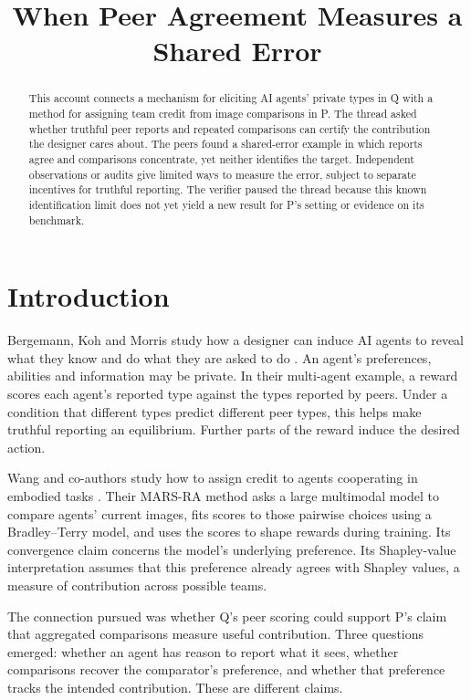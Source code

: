 \documentclass{article}
\title{When Peer Agreement Measures a Shared Error}
\begin{document}
\maketitle

\begin{abstract}
This account connects a mechanism for eliciting AI agents' private types in Q with a method for
assigning team credit from image comparisons in P. The thread asked whether truthful peer reports
and repeated comparisons can certify the contribution the designer cares about. The peers found a
shared-error example in which reports agree and comparisons concentrate, yet neither identifies the
target. Independent observations or audits give limited ways to measure the error, subject to
separate incentives for truthful reporting. The verifier paused the thread because this known
identification limit does not yet yield a new result for P's setting or evidence on its benchmark.
\end{abstract}

\section{Introduction}

Bergemann, Koh and Morris study how a designer can induce AI agents to reveal what they know and do
what they are asked to do \cite{Q}. An agent's preferences, abilities and information may be
private. In their multi-agent example, a reward scores each agent's reported type against the types
reported by peers. Under a condition that different types predict different peer types, this helps
make truthful reporting an equilibrium. Further parts of the reward induce the desired action.

Wang and co-authors study how to assign credit to agents cooperating in embodied tasks \cite{P}.
Their MARS-RA method asks a large multimodal model to compare agents' current images, fits scores to
those pairwise choices using a Bradley--Terry model, and uses the scores to shape rewards during
training. Its convergence claim concerns the model's underlying preference. Its Shapley-value
interpretation assumes that this preference already agrees with Shapley values, a measure of
contribution across possible teams.

The connection pursued was whether Q's peer scoring could support P's claim that aggregated
comparisons measure useful contribution. Three questions emerged: whether an agent has reason to
report what it sees, whether comparisons recover the comparator's preference, and whether that
preference tracks the intended contribution. These are different claims.
\end{document}
